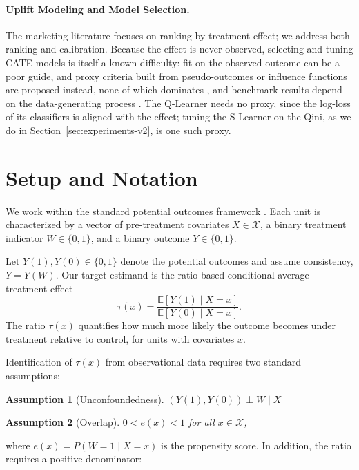 \documentclass{article}
\newtheorem{assumption}{Assumption}
\begin{document}
\paragraph{Uplift Modeling and Model Selection.}
The marketing literature \citep{radcliffe2011} focuses on ranking by
treatment effect; we address both ranking and calibration. Because the
effect is never observed, selecting and tuning CATE models is itself a
known difficulty: fit on the observed outcome can be a poor guide, and
proxy criteria built from pseudo-outcomes or influence functions are
proposed instead, none of which dominates \citep{schuler2018comparison,
saito2020counterfactual, curth2023search, mahajan2024empirical}, and
benchmark results depend on the data-generating process
\citep{curth2021neglected}. The
Q-Learner needs no proxy, since the log-loss of its classifiers is
aligned with the effect; tuning the S-Learner on the Qini, as we do in
Section~\ref{sec:experiments-v2}, is one such proxy.

\section{Setup and Notation}
\label{sec:setup}

We work within the standard potential outcomes framework
\citep{rubin1974}. Each unit is characterized by a vector of pre-treatment
covariates $X \in \mathcal{X}$, a binary treatment indicator
$W \in \{0,1\}$, and a binary outcome $Y \in \{0,1\}$. 

Let $Y(1),Y(0)\in\{0,1\}$ denote the potential outcomes and assume
consistency, $Y=Y(W)$. Our target estimand is the ratio-based
conditional average treatment effect
\begin{equation}
\tau(x) = \frac{\mathbb{E}[Y(1)\mid X{=}x]}{\mathbb{E}[Y(0)\mid X{=}x]} .
\end{equation}
The ratio $\tau(x)$ quantifies how much
more likely the outcome becomes under treatment relative to control, for
units with covariates $x$.

Identification of $\tau(x)$ from observational data requires two standard
assumptions:

\begin{assumption}[Unconfoundedness]
\label{ass:unconf}
$(Y(1), Y(0)) \perp W \mid X$
\end{assumption}

\begin{assumption}[Overlap]
\label{ass:overlap}
$0 < e(x) < 1$ for all $x \in \mathcal{X}$,
\end{assumption}
where $e(x) = P(W{=}1 \mid X{=}x)$ is the propensity score. In addition,
the ratio requires a positive denominator:
\end{document}

